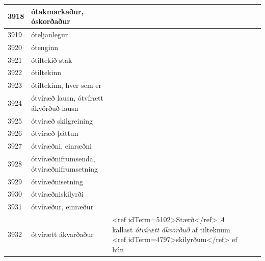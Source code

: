 \begin{longtable}{p{}|p{}|p{}|p{}|p{}}
\hline
3918 & ótakmarkaður, óskorðaður &  &  &  \\
\hline
3919 & óteljanlegur &  &  &  \\
\hline
3920 & ótenginn &  &  &  \\
\hline
3921 & ótiltekið stak &  &  &  \\
\hline
3922 & ótiltekinn &  &  &  \\
\hline
3923 & ótiltekinn, hver sem er &  &  &  \\
\hline
3924 & ótvíræð lausn, ótvírætt ákvörðuð lausn &  &  &  \\
\hline
3925 & ótvíræð skilgreining &  &  &  \\
\hline
3926 & ótvíræð þáttun &  &  &  \\
\hline
3927 & ótvíræðni, einræðni &  &  &  \\
\hline
3928 & ótvíræðnifrumsenda, ótvíræðnifrumsetning &  &  &  \\
\hline
3929 & ótvíræðnisetning &  &  &  \\
\hline
3930 & ótvíræðniskilyrði &  &  &  \\
\hline
3931 & ótvíræður, einræður &  &  &  \\
\hline
3932 & ótvírætt ákvarðaður & <ref idTerm=5102>Stærð</ref> $A$ kallast \textit{ótvírætt ákvörðuð} af tilteknum <ref idTerm=4797>skilyrðum</ref> ef hún


\end{longtable}
